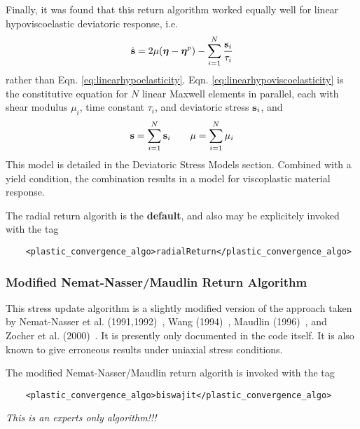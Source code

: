 Finally, it was found that this return algorithm worked equally well
for linear hypoviscoelastic deviatoric response, i.e.
  \begin{equation}\label{eq:linearhypoviscoelasticity}
    \dot{\mathbf{s}} = 2\mu(\boldsymbol{\eta} - \boldsymbol{\eta}^p) - \sum_{i=1}^N {\mathbf{s}_i\over \tau_i}
  \end{equation}
rather than Eqn. \ref{eq:linearhypoelasticity}.
Eqn. \ref{eq:linearhypoviscoelasticity} is the constitutive equation
for $N$ linear Maxwell elements in parallel, each with shear modulus
$\mu_i$, time constant $\tau_i$, and deviatoric stress $\mathbf{s}_i$, and
  \begin{equation}
    \mathbf{s} = \sum_{i=1}^N \mathbf{s}_i \quad\quad \mu = \sum_{i=1}^N \mu_i
  \end{equation}
This model is detailed in the Deviatoric Stress Models section.
Combined with a yield condition, the combination results in a
model for viscoplastic material response.

The radial return algorith is the {\bf default}, and also may be
explicitely invoked with the tag
  \begin{lstlisting}
    <plastic_convergence_algo>radialReturn</plastic_convergence_algo>
  \end{lstlisting}

\subsubsection{Modified Nemat-Nasser/Maudlin Return Algorithm}

This stress update algorithm is a slightly modified version of the
approach taken by Nemat-Nasser et
al. (1991,1992)~\cite{Nemat91,Nemat92}, Wang (1994)~\cite{Wang94},
Maudlin (1996)~\cite{Maudlin96}, and Zocher et
al. (2000)~\cite{Zocher00}.  It is presently only documented in the
code itself.  It is also known to give erroneous results under uniaxial
stress conditions.

The modified Nemat-Nasser/Maudlin return algorith is invoked with
the tag
  \begin{lstlisting}
    <plastic_convergence_algo>biswajit</plastic_convergence_algo>
  \end{lstlisting}
{\it This is an experts only algorithm!!!}

